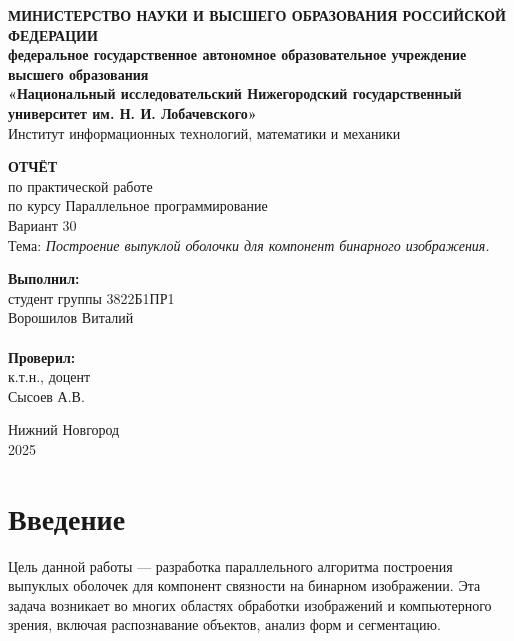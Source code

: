 \documentclass[12pt]{article}
\begin{document}
\begin{titlepage}
    \begin{center}
        \textbf{МИНИСТЕРСТВО НАУКИ И ВЫСШЕГО ОБРАЗОВАНИЯ РОССИЙСКОЙ ФЕДЕРАЦИИ}\\
        \textbf{федеральное государственное автономное образовательное учреждение высшего образования}\\
        \textbf{«Национальный исследовательский Нижегородский государственный университет им. Н. И. Лобачевского»}\\
        \vspace{0.5cm}
        Институт информационных технологий, математики и механики\\
        \vfill

        {\Large \textbf{ОТЧЁТ}}\\
        \vspace{0.5cm}
        по практической работе \\ 
        по курсу Параллельное программирование \\
        Вариант 30\\
        Тема: \textit{Построение выпуклой оболочки для компонент бинарного изображения.}
        \vfill

        \hfill\begin{minipage}{0.3\textwidth}
        \textbf{Выполнил:}\\
        студент группы 3822Б1ПР1\\
        Ворошилов Виталий\\
        \\
        \textbf{Проверил:}\\
        к.т.н., доцент\\
        Сысоев А.В.
        \end{minipage}

        \vfill
        Нижний Новгород\\
        2025
    \end{center}
\end{titlepage}

\tableofcontents
\newpage

\section{Введение}

Цель данной работы — разработка параллельного алгоритма построения выпуклых оболочек для компонент связности на бинарном изображении. Эта задача возникает во многих областях обработки изображений и компьютерного зрения, включая распознавание объектов, анализ форм и сегментацию.
\end{document}

